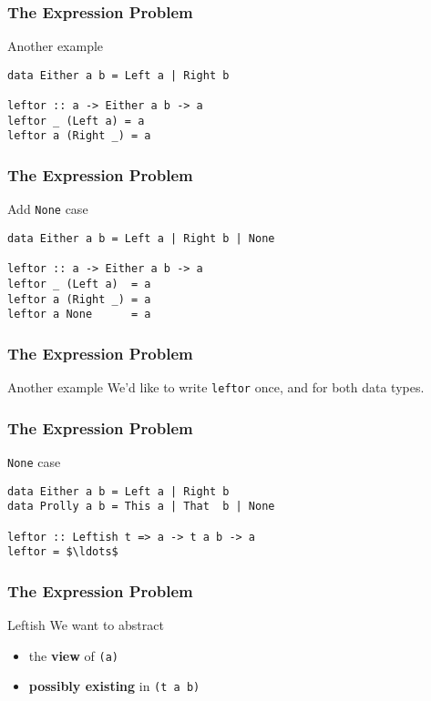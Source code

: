 \begin{frame}[fragile]
\frametitle{The Expression Problem}
\begin{block}{Another example}
\begin{lstlisting}[style=haskell,mathescape]
data Either a b = Left a | Right b

leftor :: a -> Either a b -> a
leftor _ (Left a) = a
leftor a (Right _) = a
\end{lstlisting}
\end{block}
\end{frame}

\begin{frame}[fragile]
\frametitle{The Expression Problem}
\begin{block}{Add \lstinline[style=haskell]{None} case}
\begin{lstlisting}[style=haskell,mathescape]
data Either a b = Left a | Right b | None

leftor :: a -> Either a b -> a
leftor _ (Left a)  = a
leftor a (Right _) = a
leftor a None      = a
\end{lstlisting}
\end{block}
\end{frame}

\begin{frame}[fragile]
\frametitle{The Expression Problem}
\begin{block}{Another example}
We'd like to write \lstinline[style=haskell]{leftor} once, and for both data types.
\end{block}
\end{frame}

\begin{frame}[fragile]
\frametitle{The Expression Problem}
\begin{block}{\lstinline[style=haskell]{None} case}
\begin{lstlisting}[style=haskell,mathescape]
data Either a b = Left a | Right b
data Prolly a b = This a | That  b | None 

leftor :: Leftish t => a -> t a b -> a
leftor = $\ldots$
\end{lstlisting}
\end{block}
\end{frame}

\begin{frame}[fragile]
\frametitle{The Expression Problem}
\begin{block}{Leftish}
We want to abstract
\begin{itemize}
\item the \textbf{view} of \lstinline{(a)}
\item \textbf{possibly existing} in \lstinline{(t a b)}
\end{itemize}
\end{block}
\end{frame}


